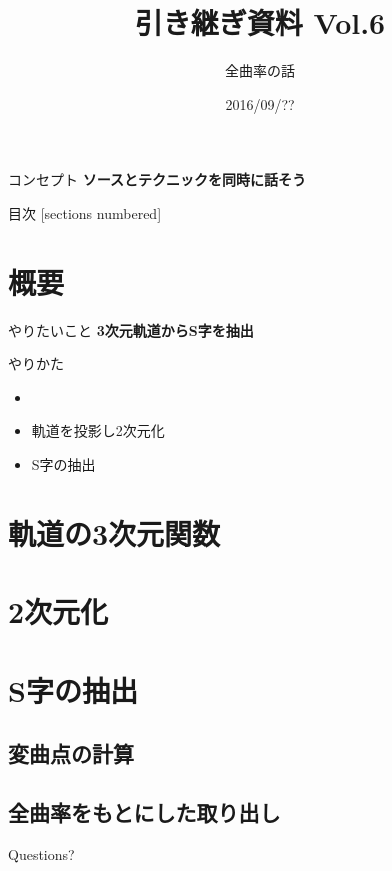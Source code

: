 \documentclass[12pt, xetex, xcolor=pdftex, dvipsnames]{beamer}
\title{引き継ぎ資料 Vol.6}
\subtitle{全曲率の話}
\date{2016/09/??}
\author{}
\institute{}
\begin{document}
\maketitle
\begin{frame}{コンセプト}
    \alert{\textbf{ソースとテクニックを同時に話そう}}
\end{frame}

\begin{frame}{目次}
  [sections numbered]
  \tableofcontents[hideallsubsections]
\end{frame}

\section{概要}
\begin{frame}{やりたいこと}
\textbf{{\large 3次元軌道からS字を抽出}}
\end{frame}
\begin{frame}{やりかた}
    \begin{itemize}
        \item {}
        \item 軌道を投影し2次元化
        \item S字の抽出
    \end{itemize}
\end{frame}

\section{軌道の3次元関数}

\section{2次元化}

\section{S字の抽出}
\subsection{変曲点の計算}
\subsection{全曲率をもとにした取り出し}

\begin{frame}[standout]
  Questions?
\end{frame}
\end{document}
